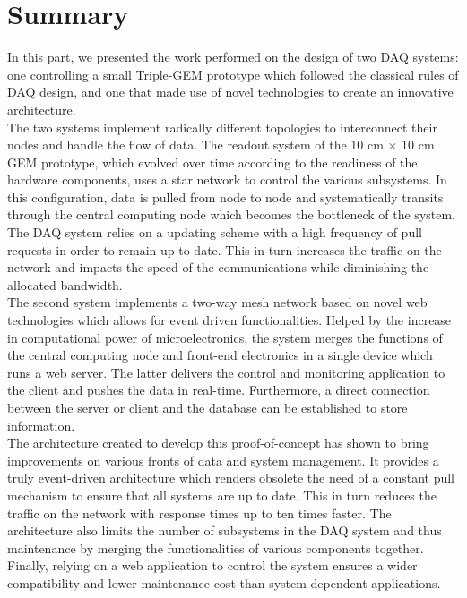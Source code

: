\chapter{Summary}
\label{chap:III-3-conclusion}

  In this part, we presented the work performed on the design of two DAQ systems: one controlling a small Triple-GEM prototype which followed the classical rules of DAQ design, and one that made use of novel technologies to create an innovative architecture. \\

  The two systems implement radically different topologies to interconnect their nodes and handle the flow of data. The readout system of the 10 cm $ \times $ 10 cm GEM prototype, which evolved over time according to the readiness of the hardware components, uses a star network to control the various subsystems. In this configuration, data is pulled from node to node and systematically transits through the central computing node which becomes the bottleneck of the system. The DAQ system relies on a updating scheme with a high frequency of pull requests in order to remain up to date. This in turn increases the traffic on the network and impacts the speed of the communications while diminishing the allocated bandwidth. \\

  The second system implements a two-way mesh network based on novel web technologies which allows for event driven functionalities. Helped by the increase in computational power of microelectronics, the system merges the functions of the central computing node and front-end electronics in a single device which runs a web server. The latter delivers the control and monitoring application to the client and pushes the data in real-time. Furthermore, a direct connection between the server or client and the database can be established to store information. \\

  The architecture created to develop this proof-of-concept has shown to bring improvements on various fronts of data and system management. It provides a truly event-driven architecture which renders obsolete the need of a constant pull mechanism to ensure that all systems are up to date. This in turn reduces the traffic on the network with response times up to ten times faster. The architecture also limits the number of subsystems in the DAQ system and thus maintenance by merging the functionalities of various components together. Finally, relying on a web application to control the system ensures a wider compatibility and lower maintenance cost than system dependent applications.
